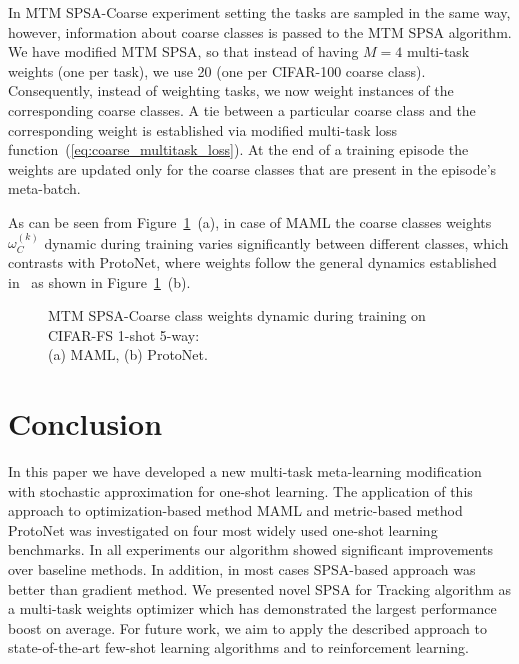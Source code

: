 \documentclass{article}
\begin{document}
In MTM SPSA-Coarse experiment setting the tasks are sampled in the same way, however, information about coarse classes is passed to the MTM SPSA algorithm. We have modified MTM SPSA, so that instead of having $M = 4$ multi-task weights (one per task), we use 20 (one per CIFAR-100 coarse class). Consequently, instead of weighting tasks, we now weight instances of the corresponding coarse classes. A tie between a particular coarse class and the corresponding weight is established via modified multi-task loss function~(\ref{eq:coarse_multitask_loss}). At the end of a training episode the weights are updated only for the coarse classes that are present in the episode's meta-batch.

As can be seen from Figure~\ref{fig:coarse-classes-cifarfs-5way-5shot}~(a), in case of MAML the coarse classes weights $\omega_C^{(k)}$ dynamic during training varies significantly between different classes, which contrasts with ProtoNet, where weights follow the general dynamics established in~\cite{boiarov2020simultaneous} as shown in Figure~\ref{fig:coarse-classes-cifarfs-5way-5shot}~(b). 


\begin{figure}[ht]
    \centering
    \caption{MTM SPSA-Coarse class weights dynamic during training on CIFAR-FS 1-shot 5-way:\\ (a) MAML, (b) ProtoNet.}
    \label{fig:coarse-classes-cifarfs-5way-5shot}
\end{figure}













\section{Conclusion}

In this paper we have developed a new multi-task meta-learning modification with stochastic approximation for one-shot learning. The application of this approach to optimization-based method MAML and metric-based method ProtoNet was investigated on four most widely used one-shot learning benchmarks. In all experiments our algorithm showed significant improvements over baseline methods. In addition, in most cases SPSA-based approach was better than gradient method. We presented novel SPSA for Tracking algorithm as a multi-task weights optimizer which has demonstrated the largest performance boost on average. For future work, we aim to apply the described approach to state-of-the-art few-shot learning algorithms and to reinforcement learning.




  
\end{document}

